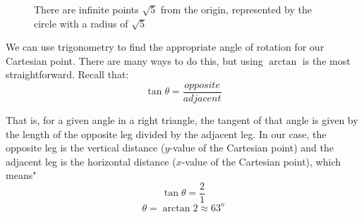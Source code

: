 \begin{figure}[htbp]
\centering
    \label{circle}
    \caption{There are infinite points $\sqrt{5}$ from the origin, represented by the circle with a radius of $\sqrt{5}$}
    \end{figure}

We can use trigonometry to find the appropriate angle of rotation for our Cartesian point. There are many ways to do this, but using $\arctan$ is the most straightforward. Recall that:
$$\tan{\theta} = \frac{opposite}{adjacent}$$

That is, for a given angle in a right triangle, the tangent of that angle is given by the length of the opposite leg divided by the adjacent leg. In our case, the opposite leg is the vertical distance ($y$-value of the Cartesian point) and the adjacent leg is the horizontal distance ($x$-value of the Cartesian point), which means"
$$\tan{\theta} = \frac{2}{1}$$
$$\theta = \arctan{2} \approx 63^o$$